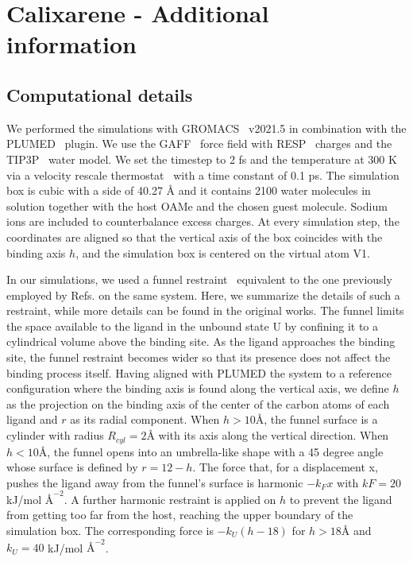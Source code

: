\clearpage
\section{Calixarene - Additional information}
    \subsection{Computational details}
            We performed the simulations with GROMACS~\cite{abraham2015gromacs} v2021.5 in combination with the PLUMED~\cite{tribello2014plumed, plumed2019promoting} plugin. We use the GAFF~\cite{wang2004development} force field with RESP~\cite{bayly1993well} charges and the TIP3P~\cite{jorgensen1983comparison} water model. 
            We set the timestep to 2 fs and the temperature at 300 K via a velocity rescale thermostat~\cite{bussi2007velocity} with a time constant of 0.1 ps.
            The simulation box is cubic with a side of 40.27 $\si{\angstrom}$ and it contains 2100 water molecules in solution together with the host OAMe and the chosen guest molecule. 
            Sodium ions are included to counterbalance excess charges. 
            At every simulation step, the coordinates are aligned so that the vertical axis of the box coincides with the binding axis $h$, and the simulation box is centered on the virtual atom V1.

        \label{sup_sec:funnel_restraint}
            In our simulations, we used a funnel restraint~\cite{limongelli2013funnel} equivalent to the one previously employed by Refs. on the same system.
            Here, we summarize the details of such a restraint, while more details can be found in the original works.
            The funnel limits the space available to the ligand in the unbound state U by confining it to a cylindrical volume above the binding site. 
            As the ligand approaches the binding site, the funnel restraint becomes wider so that its presence does not affect the binding process itself. 
            Having aligned with PLUMED the system to a reference configuration where the binding axis is found along the vertical axis, we define $h$ as the projection on the binding axis of the center of the carbon atoms of each ligand and $r$ as its radial component.
            When $h>10 \si{\angstrom}$, the funnel surface is a cylinder with radius $R_{cyl} = 2 \si{\angstrom}$ with its axis along the vertical direction. 
            When $h<10 \si{\angstrom}$, the funnel opens into an umbrella-like shape with a 45 degree angle whose surface is defined by $r=12-h$.
            The force that, for a displacement x, pushes the ligand away from the funnel’s surface is harmonic $-k_Fx$ with $kF=20 $ kJ/mol $\si{\angstrom}^{-2}$. 
            A further harmonic restraint is applied on $h$  to prevent the ligand from getting too far from the host, reaching the upper boundary of the simulation box. 
            The corresponding force is $-k_U(h-18)$ for $h > 18\si{\angstrom}$ and $k_U=40 $ kJ/mol $\si{\angstrom}^{-2}$.

